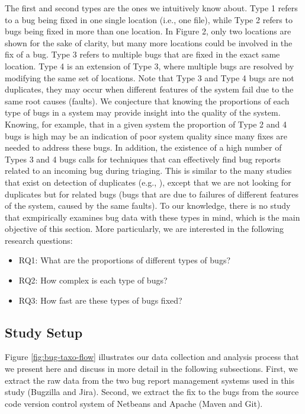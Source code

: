 The first and second types are the ones we intuitively know
about. Type 1 refers to a bug being fixed in one single location
(i.e., one file), while Type 2 refers to bugs being fixed in more
than one location. In Figure 2, only two locations are shown
for the sake of clarity, but many more locations could be
involved in the fix of a bug. Type 3 refers to multiple bugs that
are fixed in the exact same location. Type 4 is an extension of
Type 3, where multiple bugs are resolved by modifying the
same set of locations. Note that Type 3 and Type 4 bugs are
not duplicates, they may occur when different features of the
system fail due to the same root causes (faults).
We conjecture that knowing the proportions of each type
of bugs in a system may provide insight into the quality of the
system. Knowing, for example, that in a given system the
proportion of Type 2 and 4 bugs is high may be an indication
of poor system quality since many fixes are needed to address
these bugs. In addition, the existence of a high number of
Types 3 and 4 bugs calls for techniques that can effectively
find bug reports related to an incoming bug during triaging.
This is similar to the many studies that exist on detection of
duplicates (e.g., \cite{Runeson2007,Sun2010,Nguyen2012}), except that we are not looking for
duplicates but for related bugs (bugs that are due to failures of
different features of the system, caused by the same faults). To
our knowledge, there is no study that exmpirically examines
bug data with these types in mind, which is the main objective
of this section. More particularly, we are interested in the
following research questions:

\begin{itemize}
	\item RQ1: What are the proportions of different types of bugs?
	\item RQ2: How complex is each type of bugs?
	\item RQ3: How fast are these types of bugs fixed?
\end{itemize}


\subsection{Study Setup}

Figure \ref{fig:bug-taxo-flow} illustrates our data collection and analysis
process that we present here and discuss in more detail in the
following subsections. First, we extract the raw data from the
two bug report management systems used in this study
(Bugzilla and Jira). Second, we extract the fix to the bugs
from the source code version control system of Netbeans and
Apache (Maven and Git).

